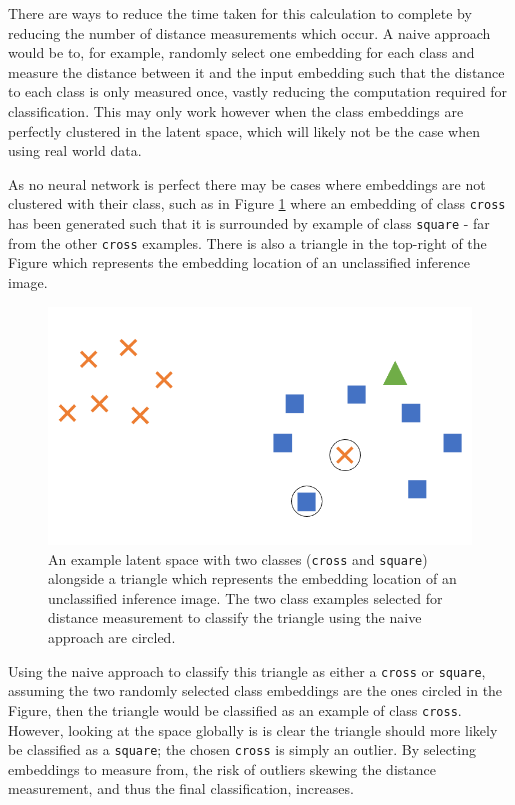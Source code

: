 There are ways to reduce the time taken for this calculation to complete by reducing the number of distance measurements which occur. A naive approach would be to, for example, randomly select one embedding for each class and measure the distance between it and the input embedding such that the distance to each class is only measured once, vastly reducing the computation required for classification. This may only work however when the class embeddings are perfectly clustered in the latent space, which will likely not be the case when using real world data.

As no neural network is perfect there may be cases where embeddings are not clustered with their class, such as in Figure \ref{fig:naive-embedding-example} where an embedding of class \texttt{cross} has been generated such that it is surrounded by example of class \texttt{square} - far from the other \texttt{cross} examples. There is also a triangle in the top-right of the Figure which represents the embedding location of an unclassified inference image. 

 \begin{figure}[h]
	\begin{center}
		\includegraphics[scale=0.5]{Chapter5/figs/naive-embedding-example.png}
	\end{center}
	\caption{An example latent space with two classes (\texttt{cross} and \texttt{square}) alongside a triangle which represents the embedding location of an unclassified inference image. The two class examples selected for distance measurement to classify the triangle using the naive approach are circled.}
	\label{fig:naive-embedding-example}
\end{figure}

Using the naive approach to classify this triangle as either a \texttt{cross} or \texttt{square}, assuming the two randomly selected class embeddings are the ones circled in the Figure, then the triangle would be classified as an example of class \texttt{cross}. However, looking at the space globally is is clear the triangle should more likely be classified as a \texttt{square}; the chosen \texttt{cross} is simply an outlier. By selecting embeddings to measure from, the risk of outliers skewing the distance measurement, and thus the final classification, increases.

